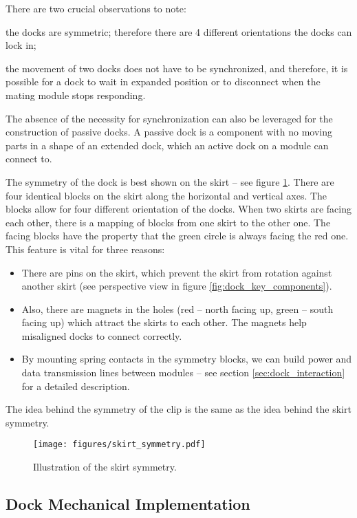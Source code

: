 There are two crucial observations to note:
\begin{enumerate*}
    \item the docks are symmetric; therefore there are 4 different orientations
    the docks can lock in;
    \item the movement of two docks does not have to be synchronized, and
    therefore, it is possible for a dock to wait in expanded position or to
    disconnect when the mating module stops responding.
\end{enumerate*}
The absence of the necessity for synchronization can also be leveraged for the
construction of passive docks. A passive dock is a component with no moving
parts in a shape of an extended dock, which an active dock on a module can
connect to.

The symmetry of the dock is best shown on the skirt -- see figure
\ref{fig:dock_skirt_symmetry}. There are four identical blocks on the skirt
along the horizontal and vertical axes. The blocks allow for four different
orientation of the docks. When two skirts are facing each other, there is a
mapping of blocks from one skirt to the other one. The facing blocks have the
property that the green circle is always facing the red one. This feature is
vital for three reasons:
\begin{itemize}
    \item There are pins on the skirt, which prevent the skirt from
    rotation against another skirt (see perspective view in figure
    \ref{fig:dock_key_components}).
    \item Also, there are magnets in the holes (red -- north facing up, green --
    south facing up) which attract the skirts to each other. The magnets help
    misaligned docks to connect correctly.
    \item By mounting spring contacts in the symmetry blocks, we can build power
    and data transmission lines between modules -- see section
    \ref{sec:dock_interaction} for a detailed description.
\end{itemize}
The idea behind the symmetry of the clip is the same as the idea behind the
skirt symmetry.

\begin{figure}[!ht]
    \centering
    \texttt{[image: figures/skirt\_symmetry.pdf]}
    \caption{Illustration of the skirt symmetry.}
    \label{fig:dock_skirt_symmetry}
\end{figure}

\subsection{Dock Mechanical Implementation}

